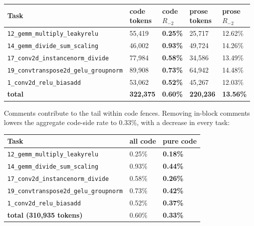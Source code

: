 \documentclass[
  11pt,
]{article}
\begin{document}
\begin{center}
\begin{minipage}{\linewidth}
\centering
\begin{tabular}{@{}lllll@{}}
\toprule
Task & code tokens & code \(R_{-2}\) & prose tokens & prose
\(R_{-2}\) \\
\midrule

\texttt{12\_gemm\_multiply\_leakyrelu} & 55,419 & \textbf{0.25\%} &
25,717 & 12.62\% \\
\texttt{14\_gemm\_divide\_sum\_scaling} & 46,002 & \textbf{0.93\%} &
49,724 & 14.26\% \\
\texttt{17\_conv2d\_instancenorm\_divide} & 77,984 & \textbf{0.58\%} &
34,586 & 13.49\% \\
\texttt{19\_convtranspose2d\_gelu\_groupnorm} & 89,908 & \textbf{0.73\%}
& 64,942 & 14.48\% \\
\texttt{1\_conv2d\_relu\_biasadd} & 53,062 & \textbf{0.52\%} & 45,267 &
12.03\% \\
\textbf{total} & \textbf{322,375} & \textbf{0.60\%} & \textbf{220,236} &
\textbf{13.56\%} \\
\bottomrule
\end{tabular}
\end{minipage}
\end{center}

Comments contribute to the tail within code fences. Removing in-block
comments lowers the aggregate code-side rate to 0.33\%, with a decrease
in every task:

\begin{center}
\begin{minipage}{\linewidth}
\centering
\begin{tabular}{@{}lll@{}}
\toprule
Task & all code & pure code \\
\midrule

\texttt{12\_gemm\_multiply\_leakyrelu} & 0.25\% & \textbf{0.18\%} \\
\texttt{14\_gemm\_divide\_sum\_scaling} & 0.93\% & \textbf{0.44\%} \\
\texttt{17\_conv2d\_instancenorm\_divide} & 0.58\% & \textbf{0.26\%} \\
\texttt{19\_convtranspose2d\_gelu\_groupnorm} & 0.73\% &
\textbf{0.42\%} \\
\texttt{1\_conv2d\_relu\_biasadd} & 0.52\% & \textbf{0.37\%} \\
\textbf{total (310,935 tokens)} & 0.60\% & \textbf{0.33\%} \\
\bottomrule
\end{tabular}
\end{minipage}
\end{center}
\end{document}
